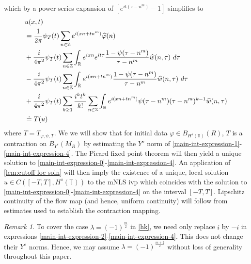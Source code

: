 \documentclass[12pt,reqno]{amsart}
\numberwithin{equation}{section}  %
\numberwithin{figure}{section}
\newcommand{\rr}{\mathbb{R}}
\newcommand{\zz}{\mathbb{Z}}
\newcommand{\ci}{\mathbb{T}}
\newcommand{\wh}{\widehat}
\newcommand{\vp}{\varphi}
\theoremstyle{plain}
\theoremstyle{definition}
\theoremstyle{remark}
\newtheorem{remark}{Remark}
\begin{document}
%
%
which by a power series expansion of $[e^{it(\tau - n^m)}-1]$ simplifies  
to
%
%
\begin{align}
	\label{main-int-expression-0}
	& u(x, t) 
		\\
		\label{main-int-expression-1}
		& = \frac{1}{2 \pi} \psi_{T}(t) \sum_{n \in \zz} e^{i(xn + tn^{m 
		})} \widehat{\vp}(n) 
		\\
		\label{main-int-expression-2}
		& + \frac{i}{4 \pi^2} \psi_{T}(t) \sum_{n\in \zz} \int_\rr e^{ixn}  
		e^{it \tau} \frac{ 1 - \psi(\tau -  n^m) 
		}{\tau -  n^m} \wh{w}(n, \tau) \ d \tau
		\\
		\label{main-int-expression-3}
		& - \frac{i}{4 \pi^2} \psi_{T}(t) \sum_{n\in \zz} \int_\rr e^{i(xn + 
		t n^m)}
		 \frac{1- \psi(\tau -  n^m)}{\tau -  n^m} \wh{w}(n, \tau) \ d \tau
		\\
		\label{main-int-expression-4}
		& + \frac{i}{4 \pi^2} \psi_{T}(t) \sum_{k \ge 1} \frac{i^k t^k}{k!}
		\sum_{n \in \zz} \int_\rr e^{i(xn + t n^m )}
		\psi(\tau -  n^m) (\tau -  n^m)^{k-1} \wh{w}(n, \tau)  
		\\
		& \doteq T(u) \notag
\end{align}
%
%
where $T = T_{\vp, \psi, T}$. We we will 
show that for initial data $\vp \in B_{H^{s}(\ci)}(R)$, $T$ is a contraction on
$B_{Y^{s}}(M_{R})$ by estimating the $Y^s$
norm of \eqref{main-int-expression-1}-\eqref{main-int-expression-4}. The 
Picard fixed point theorem will
then yield a unique solution to
\eqref{main-int-expression-0}-\eqref{main-int-expression-4}. An application of
\autoref{lem:cutoff-loc-soln} will then imply the existence of a unique, local
solution $u \in C([-T, T], H^s(\ci))$ to the mNLS ivp which coincides with the
solution to \eqref{main-int-expression-0}-\eqref{main-int-expression-4} on the
interval $[-T, T]$. Lipschitz continuity of the flow map (and hence, uniform
continuity) will follow from estimates used to establish the contraction
mapping. %
%
%
%
%
\begin{framed}
\begin{remark}
  To cover the case $\lambda = (-1)^{\frac{m}{2}}$ in \eqref{hk}, we need only
  replace $i$ by $-i$ in
  expressions \eqref{main-int-expression-2}-\eqref{main-int-expression-4}. This
  does not change their $Y^s$ norms. Hence, we may assume $\lambda =
  (-1)^{\frac{m+2}{2}}$ without loss of generality throughout this paper.
\label{rem:lambda-arb}
\end{remark}
\end{framed}
%
%
%
%
%
%
%
%
\end{document}
